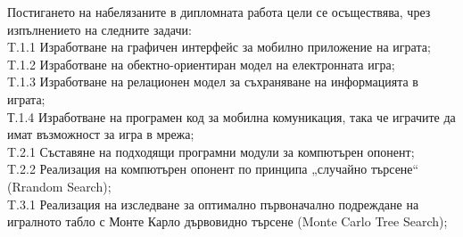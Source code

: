 Постигането на набелязаните в дипломната работа цели се осъществява, чрез изпълнението на следните задачи: \\
T.1.1 Изработване на графичен интерфейс за мобилно приложение на играта; \\
T.1.2 Изработване на обектно-ориентиран модел на електронната игра; \\
T.1.3 Изработване на релационен модел за съхраняване на информацията в играта; \\
Т.1.4 Изработване на програмен код за мобилна комуникация, така че играчите да имат възможност за игра в мрежа; \\
T.2.1 Съставяне на подходящи програмни модули за компютърен опонент; \\
T.2.2 Реализация на компютърен опонент по принципа „случайно търсене“ (Rrandom Search); \\
T.3.1 Реализация на изследване за оптимално първоначално подреждане на игралното табло с Монте Карло дървовидно търсене (Monte Carlo Tree Search); \\

